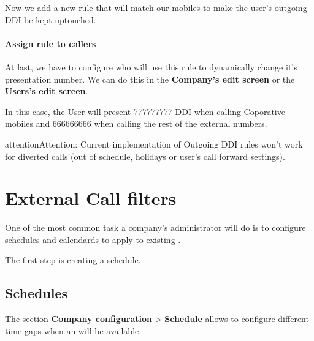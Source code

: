 \documentclass[letterpaper,10pt,english]{sphinxmanual}
\begin{document}
Now we add a new rule that will match our mobiles to make the user's outgoing
DDI be kept uptouched.

\paragraph{Assign rule to callers}

At last, we have to configure who will use this rule to dynamically change it's
presentation number. We can do this in the \textbf{Company's edit screen} or the
\textbf{Users's edit screen}.


In this case, the User will present 777777777 DDI when calling Coporative mobiles
and 666666666 when calling the rest of the external numbers.

\begin{notice}{attention}{Attention:}
Current implementation of Outgoing DDI rules won't work for
diverted calls (out of schedule, holidays or user's call forward settings).
\end{notice}


\section{External Call filters}
\label{pbx_features/external_filters:external-call-filters}\label{pbx_features/external_filters:external-filters}\label{pbx_features/external_filters::doc}
One of the most common task a company's administrator will do is to
configure schedules and calendards to apply to existing {\hyperref[pbx_features/external_ddis:external\string-ddis]{}}.

The first step is creating a schedule.


\subsection{Schedules}
\label{pbx_features/external_filters:schedules}
The section \textbf{Company configuration} \textgreater{} \textbf{Schedule} allows to configure
different time gaps when an {\hyperref[pbx_features/external_ddis:external\string-ddis]{}} will be available.
\end{document}
